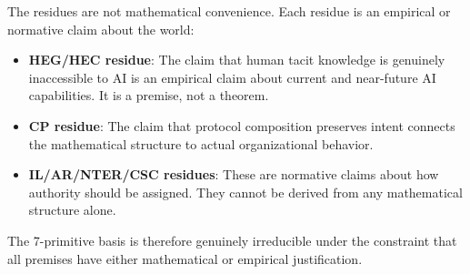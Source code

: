 The residues are not mathematical convenience. Each residue is an empirical or
normative claim about the world:

\begin{itemize}
  \item \textbf{HEG/HEC residue}: The claim that human tacit knowledge is
        genuinely inaccessible to AI is an empirical claim about current and
        near-future AI capabilities. It is a premise, not a theorem.

  \item \textbf{CP residue}: The claim that protocol composition preserves intent
        connects the mathematical structure to actual organizational behavior.

  \item \textbf{IL/AR/NTER/CSC residues}: These are normative claims about how
        authority should be assigned. They cannot be derived from any mathematical
        structure alone.
\end{itemize}

The 7-primitive basis is therefore genuinely irreducible under the constraint
that all premises have either mathematical or empirical justification.
